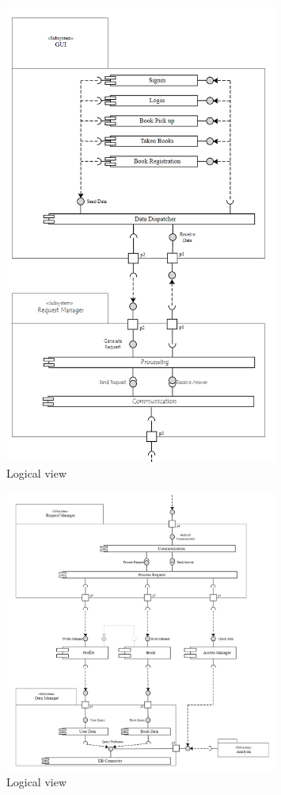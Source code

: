 \begin{figure}[h!]
	\centering
	\includegraphics[width=0.8\textwidth]{Immagini/Logical_View_part1}
	\caption{Logical view}
	\label{fig:LogicalView1}
\end{figure}
\begin{figure}[h!]
	\centering
	\includegraphics[width=0.8\textwidth]{Immagini/Logical_View_part2}
	\caption{Logical view}
	\label{fig:LogicalView2}
\end{figure}
